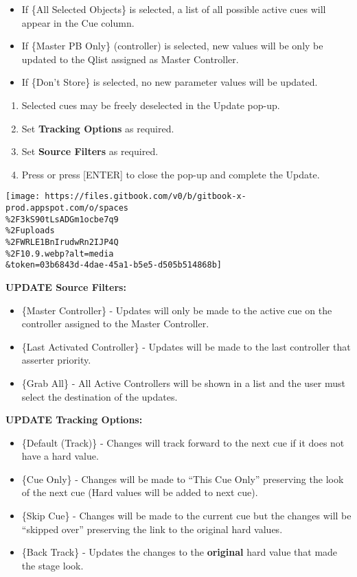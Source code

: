 \documentclass[
]{article}
\begin{document}
\begin{itemize}
\item
  If \{All Selected Objects\} is selected, a list of all possible active cues will appear in the Cue column.
\item
  If \{Master {PB} Only\} (controller) is selected, new values will be only be updated to the Qlist assigned as Master Controller.
\item
  If \{Don't Store\} is selected, no new parameter values will be updated.
\end{itemize}

\begin{enumerate}
\def\labelenumi{\arabic{enumi}.}
\setcounter{enumi}{3}
\item
  Selected cues may be freely deselected in the Update pop-up.
\item
  Set \textbf{Tracking Options} as required.
\item
  Set \textbf{Source Filters} as required.
\item
  Press \href{image.png}{} or press {[}ENTER{]} to close the pop-up and complete the Update.
\end{enumerate}

\texttt{[image: https://files.gitbook.com/v0/b/gitbook-x-prod.appspot.com/o/spaces\\\%2F3kS90tLsADGm1ocbe7q9\\\%2Fuploads\\\%2FWRLE1BnIrudwRn2IJP4Q\\\%2F10.9.webp?alt=media\\\&token=03b6843d-4dae-45a1-b5e5-d505b514868b]}

\textbf{UPDATE Source Filters:}

\begin{itemize}
\item
  \{Master Controller\} - Updates will only be made to the active cue on the controller assigned to the Master Controller.
\item
  \{Last Activated Controller\} - Updates will be made to the last controller that asserter priority.
\item
  \{Grab All\} - All Active Controllers will be shown in a list and the user must select the destination of the updates.
\end{itemize}

\textbf{UPDATE Tracking Options:}

\begin{itemize}
\item
  \{Default (Track)\} - Changes will track forward to the next cue if it does not have a hard value.
\item
  \{Cue Only\} - Changes will be made to ``This Cue Only'' preserving the look of the next cue (Hard values will be added to next cue).
\item
  \{Skip {Cue}\} - Changes will be made to the current cue but the changes will be ``skipped over'' preserving the link to the original hard values.
\item
  \{Back Track\} - Updates the changes to the \textbf{original} hard value that made the stage look.
\end{itemize}
\end{document}
